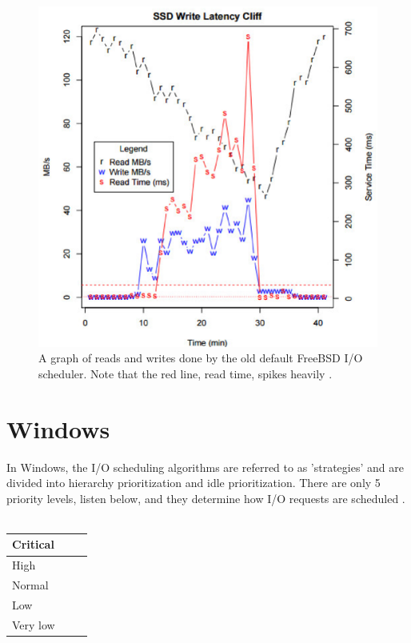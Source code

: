 \documentclass[10pt,draftclsnofoot,onecolumn,journal,compsoc]{IEEEtran}
\begin{document}
\begin{figure}[H]
\centering
    \includegraphics[scale=.85]{graph.eps}
    \caption{A graph of reads and writes done by the old default FreeBSD I/O scheduler. Note that the red line, read time, spikes heavily \cite{bsd2}.}
\end{figure}

\section{Windows}
In Windows, the I/O scheduling algorithms are referred to as 'strategies' and are divided into hierarchy prioritization and idle prioritization. There are only 5 priority levels, listen below, and they determine how I/O requests are scheduled \cite{winint}. \\ \\
\begin{tabular}{ | p{0.2\linewidth} |}
    \hline
    Critical\\ \hline
    High \\ \hline
    Normal \\ \hline
    Low \\ \hline
    Very low \\ \hline
\end{tabular} \\ \\ 
\end{document}
